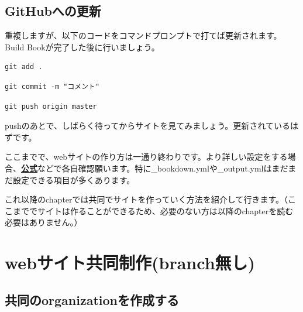 \documentclass[
]{book}
\begin{document}
\hypertarget{githubux3078ux306eux66f4ux65b0}{%
\section{GitHubへの更新}\label{githubux3078ux306eux66f4ux65b0}}

重複しますが、以下のコードをコマンドプロンプトで打てば更新されます。Build Bookが完了した後に行いましょう。

\begin{verbatim}
git add .
\end{verbatim}

\begin{verbatim}
git commit -m "コメント"
\end{verbatim}

\begin{verbatim}
git push origin master
\end{verbatim}

pushのあとで、しばらく待ってからサイトを見てみましょう。更新されているはずです。

ここまでで、webサイトの作り方は一通り終わりです。より詳しい設定をする場合、\textbf{\href{https://bookdown.org/yihui/bookdown/}{公式}}などで各自確認願います。特に\_bookdown.ymlや\_output.ymlはまだまだ設定できる項目が多くあります。

これ以降のchapterでは共同でサイトを作っていく方法を紹介して行きます。（ここまででサイトは作ることができるため、必要のない方は以降のchapterを読む必要はありません。）

\hypertarget{webux30b5ux30a4ux30c8ux5171ux540cux5236ux4f5cbranchux7121ux3057}{%
\chapter{webサイト共同制作(branch無し)}\label{webux30b5ux30a4ux30c8ux5171ux540cux5236ux4f5cbranchux7121ux3057}}

\hypertarget{ux5171ux540cux306eorganizationux3092ux4f5cux6210ux3059ux308b}{%
\section{共同のorganizationを作成する}\label{ux5171ux540cux306eorganizationux3092ux4f5cux6210ux3059ux308b}}
\end{document}

